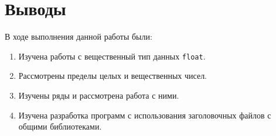 \section{Выводы}

В ходе выполнения данной работы были:

\begin{enumerate}
  \item Изучена работы с вещественный тип данных \texttt{float}.
  \item Рассмотрены пределы целых и вещественных чисел.
  \item Изучены ряды и рассмотрена работа с ними.
  \item Изучена разработка программ с использования заголовочных файлов
        с общими библиотеками.
\end{enumerate}
